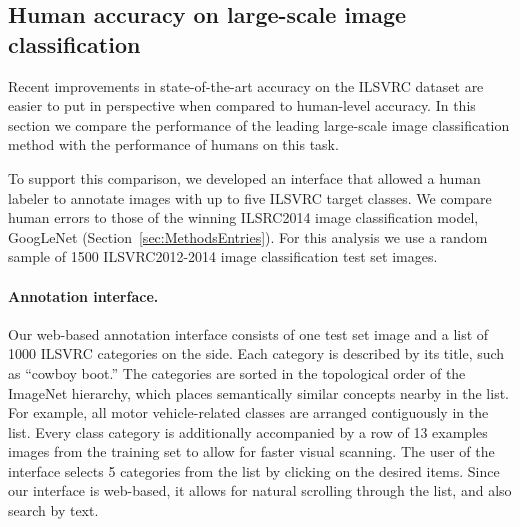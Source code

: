 


\subsection{Human accuracy on large-scale image classification}
\label{sec:ResultsHuman}

Recent improvements in state-of-the-art accuracy on the ILSVRC dataset are easier to put in perspective when compared to human-level accuracy. In this section we compare the performance of the leading large-scale image classification method with the performance of humans on this task.  

To support this comparison, we developed an interface that allowed a human labeler to annotate images with up to five ILSVRC target classes. We compare human errors to those of the winning ILSRC2014 image classification model, GoogLeNet (Section~\ref{sec:MethodsEntries}). For this analysis we use a random sample of 1500 ILSVRC2012-2014 image classification test set images.


\paragraph{Annotation interface.} Our web-based annotation interface consists of one test set image and a list of 1000 ILSVRC categories on the side. Each category is described by its title, such as ``cowboy boot.'' The categories are sorted in the topological order of the ImageNet hierarchy, which places semantically similar concepts nearby in the list. For example, all motor vehicle-related classes are arranged contiguously in the list. Every class category is additionally accompanied by a row of 13 examples images from the training set to allow for faster visual scanning. The user of the interface selects 5 categories from the list by clicking on the desired items. Since our interface is web-based, it allows for natural scrolling through the list, and also search by text.


